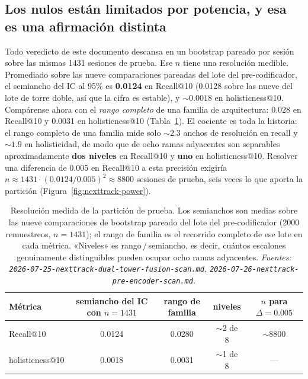 \documentclass[11pt]{article}
\begin{document}
\subsection{Los nulos están limitados por potencia, y esa es una afirmación distinta}
\label{sec:power-stats}
Todo veredicto de este documento descansa en un bootstrap pareado por sesión
sobre las mismas \num{1431} sesiones de prueba. Ese $n$ tiene una resolución
medible. Promediado sobre las nueve comparaciones pareadas del lote del
pre-codificador, el semiancho del IC al 95\% es \textbf{\num{0.0124}} en
Recall@10 (\num{0.0128} sobre las nueve del lote de torre doble, así que la cifra
es estable), y \textbf{${\sim}\num{0.0018}$} en holisticness@10. Compárense ahora
con el \emph{rango completo} de una familia de arquitectura: \num{0.028} en
Recall@10 y \num{0.0031} en holisticness@10 (Tabla~\ref{tab:power}). El cociente
es toda la historia: el rango completo de una familia mide solo ${\sim}2.3$
anchos de resolución en recall y ${\sim}1.9$ en holisticidad, de modo que de ocho
ramas adyacentes son separables aproximadamente \textbf{dos niveles} en Recall@10
y \textbf{uno} en holisticness@10. Resolver una diferencia de \num{0.005} en
Recall@10 a esta precisión exigiría
$n \approx 1431\cdot(\num{0.0124}/\num{0.005})^2 \approx \num{8800}$ sesiones de
prueba, seis veces lo que aporta la partición
(Figura~\ref{fig:nexttrack-power}).

\begin{table}[ht]
  \centering
  \caption{Resolución medida de la partición de prueba. Los semianchos son medias
  sobre las nueve comparaciones de bootstrap pareado del lote del
  pre-codificador (\num{2000} remuestreos, $n=\num{1431}$); el rango de familia
  es el recorrido completo de ese lote en cada métrica. «Niveles» es
  rango\,$/$\,semiancho, es decir, cuántos escalones genuinamente distinguibles
  pueden ocupar ocho ramas adyacentes. \emph{Fuentes:
  \texttt{2026-07-25-nexttrack-dual-tower-fusion-scan.md},
  \texttt{2026-07-26-nexttrack-pre-encoder-scan.md}.}}
  \label{tab:power}
  {\footnotesize\setlength{\tabcolsep}{6pt}\begin{tabular}{lcccc}
    \toprule
    Métrica & semiancho del IC con $n=\num{1431}$ & rango de familia & niveles & $n$ para $\Delta=\num{0.005}$ \\
    \midrule
    Recall@10 & 0.0124 & 0.0280 & $\sim$2 de 8 & $\sim$\num{8800} \\
    holisticness@10 & 0.0018 & 0.0031 & $\sim$1 de 8 & --- \\
    \bottomrule
  \end{tabular}}
\end{table}
\end{document}
